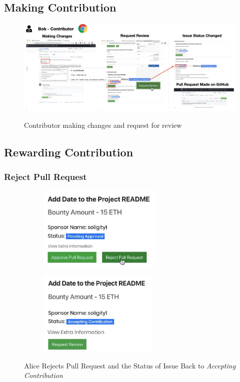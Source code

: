 \documentclass[12pt]{article}
\renewcommand{\_}{\kern-1.5pt\textunderscore\kern-1.5pt}
\begin{document}
\subsection{Making Contribution}
\begin{figure}[H]
	\centering
	\includegraphics[width=16.5cm]{graphs/53. contribute_1.png}\\
	\caption{Contributor making changes and request for review}
	\label{fig:contribute1}
\end{figure}

\subsection{Rewarding Contribution}


\subsubsection{Reject Pull Request}

\begin{figure}[H]
	\centering
	\begin{subfigure}[b]{.45\textwidth}
		\centering
		\includegraphics[height=4cm]{graphs/38. alice_reject_pull_request}
	\end{subfigure}
	\begin{subfigure}[b]{.45\textwidth}
		\centering
		\includegraphics[height=4cm]{graphs/39. issue_info_updated}
	\end{subfigure}
	\caption{Alice Rejects Pull Request and the Status of Issue Back to \textit{Accepting Contribution}}
\end{figure}
\end{document}
